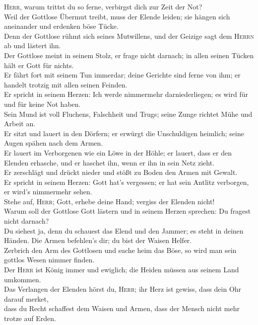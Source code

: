  \textsc{Herr}, warum trittst du so ferne, verbirgst dich
zur Zeit der Not?\\
 Weil der Gottlose Übermut treibt, muss der Elende leiden;
sie hängen sich aneinander und erdenken böse Tücke.\\
 Denn der Gottlose rühmt sich seines Mutwillens, und der
Geizige sagt dem \textsc{Herrn} ab und lästert ihn.\\
 Der Gottlose meint in seinem Stolz, er frage nicht
darnach; in allen seinen Tücken hält er Gott für nichts.\\
 Er fährt fort mit seinem Tun immerdar; deine Gerichte
sind ferne von ihm; er handelt trotzig mit allen seinen Feinden.\\
 Er spricht in seinem Herzen: Ich werde nimmermehr
darniederliegen; es wird für und für keine Not haben.\\
 Sein Mund ist voll Fluchens, Falschheit und Trugs; seine
Zunge richtet Mühe und Arbeit an.\\
 Er sitzt und lauert in den Dörfern; er erwürgt die
Unschuldigen heimlich; seine Augen spähen nach dem Armen.\\
 Er lauert im Verborgenen wie ein Löwe in der Höhle; er
lauert, dass er den Elenden erhasche, und er haschet ihn, wenn er ihn in
sein Netz zieht.\\
 Er zerschlägt und drückt nieder und stößt zu Boden den
Armen mit Gewalt.\\
 Er spricht in seinem Herzen: Gott hat's vergessen; er
hat sein Antlitz verborgen, er wird's nimmermehr sehen.\\
 Stehe auf, \textsc{Herr}; Gott, erhebe deine Hand;
vergiss der Elenden nicht!\\
 Warum soll der Gottlose Gott lästern und in seinem
Herzen sprechen: Du fragest nicht darnach?\\
 Du siehest ja, denn du schauest das Elend und den
Jammer; es steht in deinen Händen. Die Armen befehlen's dir; du bist der
Waisen Helfer.\\
 Zerbrich den Arm des Gottlosen und suche heim das Böse,
so wird man sein gottlos Wesen nimmer finden.\\
 Der \textsc{Herr} ist König immer und ewiglich; die
Heiden müssen aus seinem Land umkommen.\\
 Das Verlangen der Elenden hörst du, \textsc{Herr}; ihr
Herz ist gewiss, dass dein Ohr darauf merket,\\
 dass du Recht schaffest dem Waisen und Armen, dass der
Mensch nicht mehr trotze auf Erden.

